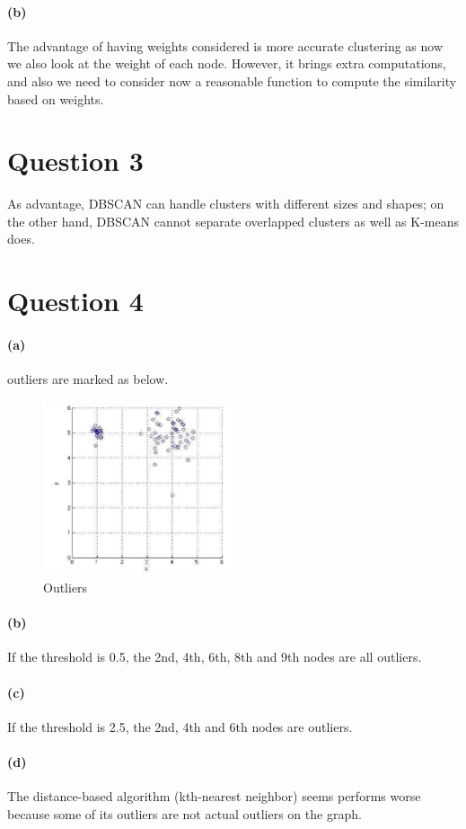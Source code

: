 \documentclass[paper=a4, fontsize=11pt]{scrartcl} %
\begin{document}
\paragraph{(b)} The advantage of having weights considered is more accurate clustering as now we also look at the weight of each node. However, it brings extra computations, and also we need to consider now a reasonable function to compute the similarity based on weights.

\section*{Question 3}

As advantage, DBSCAN can handle clusters with different sizes and shapes; on the other hand, DBSCAN cannot separate overlapped clusters as well as K-means does.

\section*{Question 4}

\paragraph{(a)} outliers are marked as below.

\begin{figure}[htbp]
\begin{center}
\includegraphics[width=0.5\textwidth]{hw4pic1}
\caption{Outliers}
\label{hw4pic1}
\end{center}
\end{figure}


\paragraph{(b)} If the threshold is 0.5, the 2nd, 4th, 6th, 8th and 9th nodes are all outliers.

\paragraph{(c)} If the threshold is 2.5, the 2nd, 4th and 6th nodes are outliers.

\paragraph{(d)} The distance-based algorithm (kth-nearest neighbor) seems performs worse because some of its outliers are not actual outliers on the graph.
\end{document}
